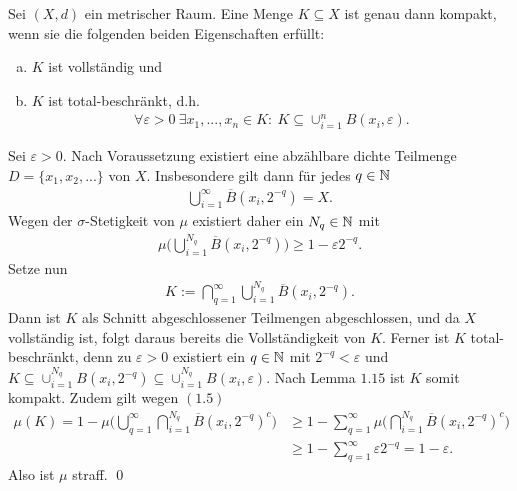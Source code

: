 \begin{lemma}
    Sei $(X,d)$ ein metrischer Raum. Eine Menge $K \subseteq X$ ist genau dann kompakt, wenn sie die folgenden beiden Eigenschaften erfüllt: 
    \begin{enumerate}[(a)]
        \item $K$ ist vollständig und 
        \item $K$ ist total-beschränkt, d.h.
        \begin{align*}
            \forall  \varepsilon > 0 \ \exists x_1,...,x_n \in K: \  K \subseteq \cup_{i=1}^n B(x_i, \varepsilon). 
        \end{align*} 
\end{enumerate}
\end{lemma}

\begin{proof*}
    Sei $\varepsilon > 0$. Nach Voraussetzung existiert eine abzählbare dichte Teilmenge $D = \{x_1, x_2,...\}$ von $X$. Insbesondere gilt dann für jedes $q \in \mathbb{N} $
    \begin{align*}
        \bigcup_{i = 1}^{\infty}\overline{B}(x_i, 2^{-q}) = X.
    \end{align*}
    Wegen der $\sigma$-Stetigkeit von $\mu$ existiert daher ein $N_q \in \mathbb{N}$ mit 
    \begin{align}
        \mu\big(\bigcup_{i=1}^{N_q}\overline{B}(x_i, 2^{-q})\big) \geq 1 - \varepsilon 2^{-q}. 
    \end{align}
    Setze nun 
    \begin{align*}
        K := \bigcap_{q = 1}^{\infty}\bigcup_{i=1}^{N_q}\overline{B}(x_i, 2^{-q}). 
    \end{align*}
    Dann ist $K$ als Schnitt abgeschlossener Teilmengen abgeschlossen, und da $X$ vollständig ist, folgt daraus bereits die Vollständigkeit von $K$. 
    Ferner ist $K$ total-beschränkt, denn zu $\varepsilon > 0$ existiert ein $q \in \mathbb{N}$ mit $2^{-q} < \varepsilon$ und $K \subseteq \cup_{i=1}^{N_q}B(x_i, 2^{-q}) \subseteq \cup_{i=1}^{N_q}B(x_i, \varepsilon)$. 
    Nach Lemma $1.15$ ist $K$ somit kompakt. Zudem gilt wegen $(1.5)$
    \begin{align*}
        \mu(K)  = 1 - \mu\big(\bigcup_{q = 1}^{\infty}\bigcap_{i=1}^{N_q}\overline{B}(x_i, 2^{-q})^c\big) 
                &\geq 1 - \sum_{q=1}^{\infty} \mu\big(\bigcap_{i=1}^{N_q}\overline{B}(x_i, 2^{-q})^c\big) \\\
                &\geq 1 - \sum_{q=1}^{\infty} \varepsilon 2^{-q} = 1 - \varepsilon.
    \end{align*}
    Also ist $\mu$ straff. \qed
\end{proof*}

